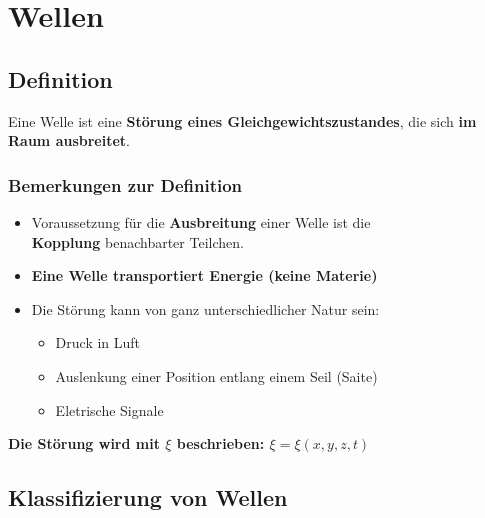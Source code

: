 \section{Wellen}

\subsection{Definition}

Eine Welle ist eine \textbf{Störung eines Gleichgewichtszustandes}, die sich \textbf{im Raum ausbreitet}.


\subsubsection{Bemerkungen zur Definition}

\begin{itemize}

	\item Voraussetzung für die \textbf{Ausbreitung} einer Welle ist die \\
		\textbf{Kopplung} benachbarter Teilchen.	
	\item \textbf{Eine Welle transportiert Energie (keine Materie)} 
	\item Die Störung kann von ganz unterschiedlicher Natur sein: 
		\begin{itemize}
			\item Druck in Luft
			\item Auslenkung einer Position entlang einem Seil (Saite)
			\item Eletrische Signale  
		\end{itemize}
\end{itemize}


\textbf{Die Störung wird mit $\xi$ beschrieben: $\xi = \xi(x, y, z, t)$}



\subsection{Klassifizierung von Wellen}

